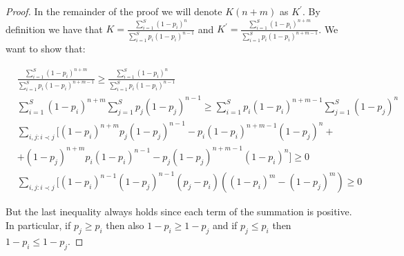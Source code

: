\documentclass[conference]{IEEEtran}
\begin{document}
\begin{proof}
In the remainder of the proof we will denote $K(n+m)$ as $K^{\prime}$. By definition we have that $K = \frac{\sum_{i=1}^S (1-p_i)^n}{\sum_{i=1}^S p_i(1-p_i)^{n-1}}$ and $K^{\prime} = \frac{\sum_{i=1}^S (1-p_i)^{n+m}}{\sum_{i=1}^S p_i(1-p_i)^{n+m-1}}$. We want to show that:

{\small
\begin{align}
&\frac{\sum_{i=1}^S (1-p_i)^{n+m}}{\sum_{i=1}^S p_i(1-p_i)^{n+m-1}} \geq \frac{\sum_{i=1}^S (1-p_i)^n}{\sum_{i=1}^S p_i(1-p_i)^{n-1}} \nonumber \\
&\sum_{i=1}^S (1-p_i)^{n+m}\sum_{j=1}^S p_j(1-p_j)^{n-1} \geq \sum_{i=1}^S p_i(1-p_i)^{n+m-1}\sum_{j=1}^S (1-p_j)^n\nonumber \\
&\sum_{i,j:i\prec j}[(1-p_i)^{n+m}p_j(1-p_j)^{n-1} - p_i(1-p_i)^{n+m-1}(1-p_j)^n + \nonumber \\
& + (1-p_j)^{n+m}p_i(1-p_i)^{n-1} - p_j(1-p_j)^{n+m-1}(1-p_i)^n] \geq 0 \nonumber \\
&\sum_{i,j:i\prec j}[(1-p_i)^{n-1}(1-p_j)^{n-1}(p_j-p_i)((1-p_i)^{m} - (1-p_j)^{m}) \geq 0
\end{align}}

But the last inequality always holds since each term of the summation is positive. In particular, if $p_j \geq p_i$ then
also $1-p_i \geq 1-p_j$ and if $p_j \leq p_i$ then $1-p_i \leq 1-p_j$.
\end{proof}
\end{document}
